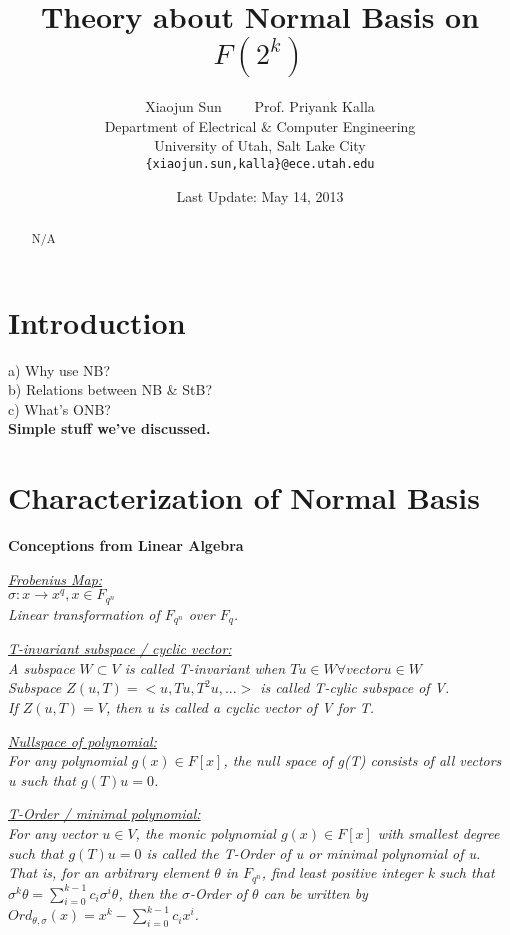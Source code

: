\documentclass[12pt]{article}
\title{Theory about Normal Basis on $F(2^k)$}
\author{Xiaojun Sun \ \ \ \ Prof. Priyank Kalla\\
\small Department of Electrical \& Computer Engineering\\[-0.8ex]
\small University of Utah, Salt Lake City\\
\small \texttt{\{xiaojun.sun,kalla\}@ece.utah.edu}
}
\date{Last Update: May 14, 2013}
\begin{document}
\maketitle

\begin{abstract}
N/A
\end{abstract}

\section{Introduction}

a) Why use NB?\\
b) Relations between NB \& StB?\\
c) What's ONB?\\
{\bf Simple stuff we've discussed.}

\section{Characterization of Normal Basis}
\textbf{Conceptions from Linear Algebra}


\textit{\underline{Frobenius Map:} \\
$\sigma : x \rightarrow x^q, x \in F_{q^n}$ \\
Linear transformation of $F_{q^n}$ over $F_q$. \\
}

\textit{\underline{T-invariant subspace / cyclic vector:} \\
A subspace $W \subset V$ is called T-invariant when $Tu \in W \forall vector u \in W$\\
Subspace $Z(u,T) = <u,Tu,T^2u,...>$ is called T-cylic subspace of V. \\
If $Z(u,T) = V$, then u is called a cyclic vector of V for T.\\
}

\textit{\underline{Nullspace of polynomial:} \\
For any polynomial $g(x) \in F[x]$, the null space of g(T) consists of all vectors u such that
$g(T)u = 0$.\\
}

\textit{\underline{T-Order / minimal polynomial:} \\
For any vector $u \in V$, the monic polynomial $g(x) \in F[x]$ with smallest degree such that
$g(T)u = 0$ is called the T-Order of u or minimal polynomial of u.\\
That is, for an arbitrary element $\theta$ in $F_{q^n}$, find least positive integer k such that
$\sigma^k\theta = \sum_{i=0}^{k-1} c_i\sigma^i\theta$, then the $\sigma$-Order of $\theta$ can be 
written by $Ord_{\theta,\sigma}(x) = x^k - \sum_{i=0}^{k-1} c_ix^i$. \\
}
\end{document}
